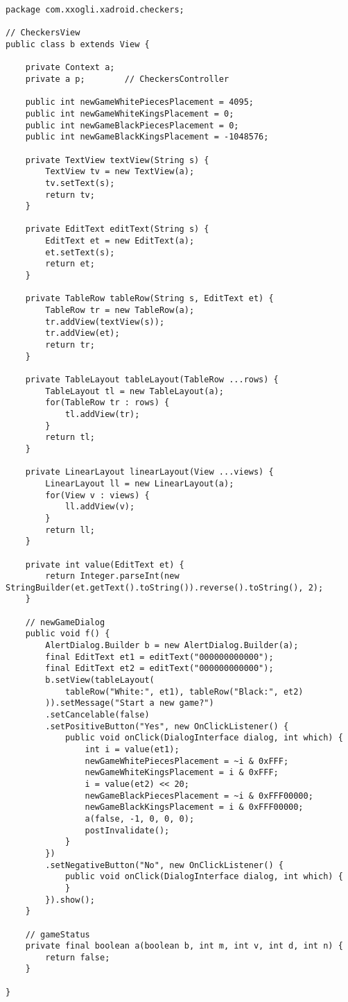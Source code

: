\begin{lstlisting}[caption=b.java (CheckersView.java), label=lstPlacementB]
package com.xxogli.xadroid.checkers;

// CheckersView
public class b extends View {

	private Context a;
	private a p;		// CheckersController
	
	public int newGameWhitePiecesPlacement = 4095;
	public int newGameWhiteKingsPlacement = 0;
	public int newGameBlackPiecesPlacement = 0;
	public int newGameBlackKingsPlacement = -1048576;

	private TextView textView(String s) {
		TextView tv = new TextView(a);
		tv.setText(s);
		return tv;
	}
	
	private EditText editText(String s) {
		EditText et = new EditText(a);
		et.setText(s);
		return et;
	}
	
	private TableRow tableRow(String s, EditText et) {
		TableRow tr = new TableRow(a);
		tr.addView(textView(s));
		tr.addView(et);
		return tr;
	}
	
	private TableLayout tableLayout(TableRow ...rows) {
		TableLayout tl = new TableLayout(a);
		for(TableRow tr : rows) {
			tl.addView(tr);
		}
		return tl;
	}
	
	private LinearLayout linearLayout(View ...views) {
		LinearLayout ll = new LinearLayout(a);
		for(View v : views) {
			ll.addView(v);
		}
		return ll;
	}

	private int value(EditText et) {
		return Integer.parseInt(new StringBuilder(et.getText().toString()).reverse().toString(), 2);
	}
	
	// newGameDialog
	public void f() {
		AlertDialog.Builder b = new AlertDialog.Builder(a);
		final EditText et1 = editText("000000000000");
		final EditText et2 = editText("000000000000");
		b.setView(tableLayout(
			tableRow("White:", et1), tableRow("Black:", et2)
		)).setMessage("Start a new game?")
		.setCancelable(false)
		.setPositiveButton("Yes", new OnClickListener() {
			public void onClick(DialogInterface dialog, int which) {
				int i = value(et1);
				newGameWhitePiecesPlacement = ~i & 0xFFF;
				newGameWhiteKingsPlacement = i & 0xFFF;
				i = value(et2) << 20;
				newGameBlackPiecesPlacement = ~i & 0xFFF00000;
				newGameBlackKingsPlacement = i & 0xFFF00000;
				a(false, -1, 0, 0, 0);
				postInvalidate();
			}
		})
		.setNegativeButton("No", new OnClickListener() {
			public void onClick(DialogInterface dialog, int which) {
			}
		}).show();
	}
	
	// gameStatus
	private final boolean a(boolean b, int m, int v, int d, int n) {
		return false;
	}

}
\end{lstlisting}

